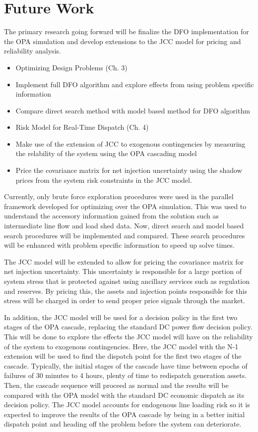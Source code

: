 \section{Future Work}
The primary research going forward will be finalize the DFO implementation for the OPA simulation and develop extensions to the JCC model for pricing and reliability analysis.
\begin{itemize}
\item Optimizing Design Problems (Ch. 3)
\bi
\item Implement full DFO algorithm and explore effects from using problem specific information
\item Compare direct search method with model based method for DFO algorithm
\ei
\item Risk Model for Real-Time Dispatch (Ch. 4)
\bi
\item Make use of the extension of JCC to exogenous contingencies by measuring the relability of the system using the OPA cascading model
\item Price the covariance matrix for net injection uncertainty using the shadow prices from the system risk constraints in the JCC model.
\ei
\end{itemize}

Currently, only brute force exploration procedures were used in the parallel framework developed for optimizing over the OPA simulation.  This was used to understand the accessory information gained from the solution such as intermediate line flow and load shed data.  Now, direct search and model based search procedures will be implemented and compared.  These search procedures will be enhanced with problem specific information to speed up solve times.

The JCC model will be extended to allow for pricing the covariance matrix for net injection uncertainty.  This uncertainty is responsible for a large portion of system stress that is protected against using ancillary services such as regulation and reserves.  By pricing this, the assets and injection points responsible for this stress will be charged in order to send proper price signals through the market.

In addition, the JCC model will be used for a decision policy in the first two stages of the OPA cascade, replacing the standard DC power flow decision policy.  This will be done to explore the effects the JCC model will have on the reliability of the system to exogenous contingencies.  Here, the JCC model with the N-1 extension will be used to find the dispatch point for the first two stages of the cascade.  Typically, the initial stages of the cascade have time between epochs of failures of 30 minutes to 4 hours, plenty of time to redispatch generation assets.  Then, the cascade sequence will proceed as normal and the results will be compared with the OPA model with the standard DC economic dispatch as its decision policy.  The JCC model accounts for endogenous line loading risk so it is expected to improve the results of the OPA cascade by being in a better initial dispatch point and heading off the problem before the system can deteriorate.  


